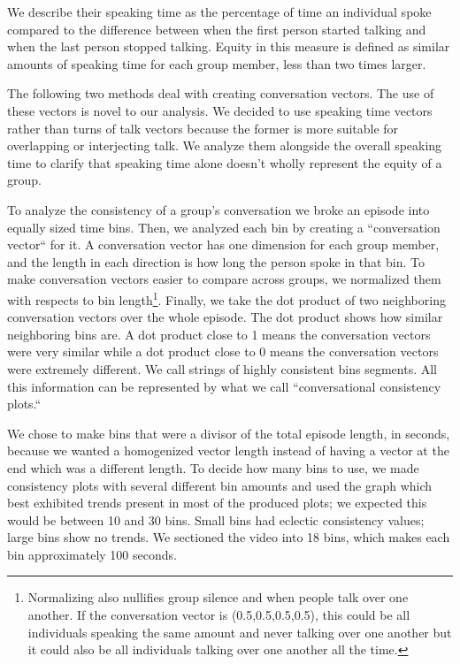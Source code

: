 \documentclass[aps,pra,reprint,noshowpacs,superscriptaddress, nofootinbib]{revtex4-1}
\begin{document}
   We describe their speaking time as the percentage of time an individual spoke compared to the difference between when the first person started talking and when the last person stopped talking. Equity in this measure is defined as similar amounts of speaking time for each group member, less than two times larger.
   
The following two methods deal with creating conversation vectors. The use of these vectors is novel to our analysis. We decided to use speaking time vectors rather than turns of talk vectors because the former is more suitable for overlapping or interjecting talk. We analyze them alongside the overall speaking time to clarify that speaking time alone doesn't wholly represent the equity of a group.
   
   
   To analyze the consistency of a group's conversation we broke an episode into equally sized time bins. Then, we analyzed each bin by creating a ``conversation vector`` for it. A conversation vector has one dimension for each group member, and the length in each direction is how long the person spoke in that bin. To make conversation vectors easier to compare across groups, we normalized them with respects to bin length\footnote{Normalizing also nullifies group silence and when people talk over one another. If the conversation vector is (0.5,0.5,0.5,0.5), this could be all individuals speaking the same amount and never talking over one another but it could also be all individuals talking over one another all the time.}. Finally, we take the dot product of two neighboring conversation vectors over the whole episode. The dot product shows how similar neighboring bins are. A dot product close to 1 means the conversation vectors were very similar while a dot product close to 0 means the conversation vectors were extremely different.  We call strings of highly consistent bins segments. All this information can be represented by what we call ``conversational consistency plots.``
   
   We chose to make bins that were a divisor of the total episode length, in seconds, because we wanted a homogenized vector length instead of having a vector at the end which was a different length. To decide how many bins to use, we made consistency plots with several different bin amounts and used the graph which best exhibited trends present in most of the produced plots; we expected this would be between 10 and 30 bins. Small bins had eclectic consistency values; large bins show no trends. We sectioned the video into 18 bins, which makes each bin approximately 100 seconds. 
\end{document}
